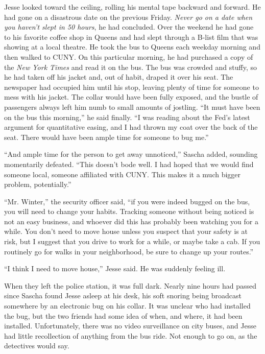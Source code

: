 \documentclass[12pt]{book}
\begin{document}
Jesse looked toward the ceiling, rolling his mental tape backward and forward.  He had gone on a disastrous date on the previous Friday.  \emph{Never go on a date when you haven't slept in 50 hours}, he had concluded.  Over the weekend he had gone to his favorite coffee shop in Queens and had slept through a B-list film that was showing at a local theatre.  He took the bus to Queens each weekday morning and then walked to CUNY.  On this particular morning, he had purchased a copy of the \emph{New York Times} and read it on the bus.  The bus was crowded and stuffy, so he had taken off his jacket and, out of habit, draped it over his seat.  The newspaper had occupied him until his stop, leaving plenty of time for someone to mess with his jacket.  The collar would have been fully exposed, and the bustle of passengers always left him numb to small amounts of jostling.  ``It must have been on the bus this morning,'' he said finally.  ``I was reading about the Fed's latest argument for quantitative easing, and I had thrown my coat over the back of the seat.  There would have been ample time for someone to bug me.''

``And ample time for the person to get away unnoticed,'' Sascha added, sounding momentarily defeated.  ``This doesn't bode well.  I had hoped that we would find someone local, someone affiliated with CUNY.  This makes it a much bigger problem, potentially.''

``Mr. Winter,'' the security officer said, ``if you were indeed bugged on the bus, you will need to change your habits.  Tracking someone without being noticed is not an easy business, and whoever did this has probably been watching you for a while.  You don't need to move house unless you suspect that your safety is at risk, but I suggest that you drive to work for a while, or maybe take a cab.  If you routinely go for walks in your neighborhood, be sure to change up your routes.''

``I think I need to move house,'' Jesse said.  He was suddenly feeling ill.


When they left the police station, it was full dark.  Nearly nine hours had passed since Sascha found Jesse asleep at his desk, his soft snoring being broadcast somewhere by an electronic bug on his collar.  It was unclear who had installed the bug, but the two friends had some idea of when, and where, it had been installed.  Unfortunately, there was no video surveillance on city buses, and Jesse had little recollection of anything from the bus ride.  Not enough to go on, as the detectives would say.
\end{document}
